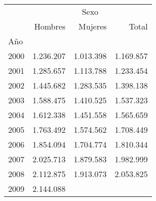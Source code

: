 \begin{tabular}{llll}
\cline{1-4}
\multicolumn{1}{c}{} &
  \multicolumn{3}{|c}{Sexo} \\
\multicolumn{1}{c}{} &
  \multicolumn{1}{|r}{Hombres} &
  \multicolumn{1}{r}{Mujeres} &
  \multicolumn{1}{r}{Total} \\
\cline{1-4}
\multicolumn{1}{l}{Año} &
  \multicolumn{1}{|r}{} &
  \multicolumn{1}{r}{} &
  \multicolumn{1}{r}{} \\
\multicolumn{1}{l}{\hspace{1em}2000} &
  \multicolumn{1}{|r}{1.236.207} &
  \multicolumn{1}{r}{1.013.398} &
  \multicolumn{1}{r}{1.169.857} \\
\multicolumn{1}{l}{\hspace{1em}2001} &
  \multicolumn{1}{|r}{1.285.657} &
  \multicolumn{1}{r}{1.113.788} &
  \multicolumn{1}{r}{1.233.454} \\
\multicolumn{1}{l}{\hspace{1em}2002} &
  \multicolumn{1}{|r}{1.445.682} &
  \multicolumn{1}{r}{1.283.535} &
  \multicolumn{1}{r}{1.398.138} \\
\multicolumn{1}{l}{\hspace{1em}2003} &
  \multicolumn{1}{|r}{1.588.475} &
  \multicolumn{1}{r}{1.410.525} &
  \multicolumn{1}{r}{1.537.323} \\
\multicolumn{1}{l}{\hspace{1em}2004} &
  \multicolumn{1}{|r}{1.612.338} &
  \multicolumn{1}{r}{1.451.558} &
  \multicolumn{1}{r}{1.565.659} \\
\multicolumn{1}{l}{\hspace{1em}2005} &
  \multicolumn{1}{|r}{1.763.492} &
  \multicolumn{1}{r}{1.574.562} &
  \multicolumn{1}{r}{1.708.449} \\
\multicolumn{1}{l}{\hspace{1em}2006} &
  \multicolumn{1}{|r}{1.854.094} &
  \multicolumn{1}{r}{1.704.774} &
  \multicolumn{1}{r}{1.810.344} \\
\multicolumn{1}{l}{\hspace{1em}2007} &
  \multicolumn{1}{|r}{2.025.713} &
  \multicolumn{1}{r}{1.879.583} &
  \multicolumn{1}{r}{1.982.999} \\
\multicolumn{1}{l}{\hspace{1em}2008} &
  \multicolumn{1}{|r}{2.112.875} &
  \multicolumn{1}{r}{1.913.073} &
  \multicolumn{1}{r}{2.053.825} \\
\multicolumn{1}{l}{\hspace{1em}2009} &
  \multicolumn{1}{|r}{2.144.088} &

\end{tabular}
